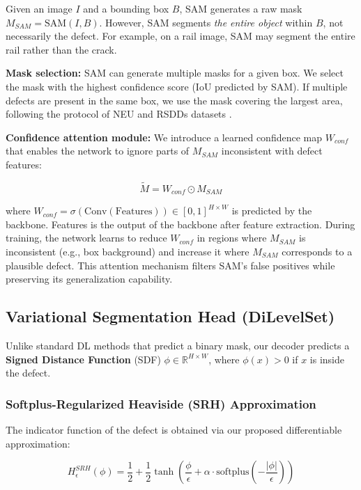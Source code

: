 \documentclass[12pt, a4paper]{article}
\newcommand{\R}{\mathbb{R}}
\begin{document}
Given an image $I$ and a bounding box $B$, SAM generates a raw mask $M_{SAM} = \text{SAM}(I, B)$. However, SAM segments \textit{the entire object} within $B$, not necessarily the defect. For example, on a rail image, SAM may segment the entire rail rather than the crack.

\textbf{Mask selection:} SAM can generate multiple masks for a given box. We select the mask with the highest confidence score (IoU predicted by SAM). If multiple defects are present in the same box, we use the mask covering the largest area, following the protocol of NEU and RSDDs datasets \cite{neu2024, rsdds2024}.

\textbf{Confidence attention module:} We introduce a learned confidence map $W_{conf}$ that enables the network to ignore parts of $M_{SAM}$ inconsistent with defect features:

\begin{equation}
\tilde{M} = W_{conf} \odot M_{SAM}
\label{eq:weighted_mask}
\end{equation}

where $W_{conf} = \sigma(\text{Conv}(\text{Features})) \in [0,1]^{H \times W}$ is predicted by the backbone. Features is the output of the backbone after feature extraction. During training, the network learns to reduce $W_{conf}$ in regions where $M_{SAM}$ is inconsistent (e.g., box background) and increase it where $M_{SAM}$ corresponds to a plausible defect. This attention mechanism filters SAM's false positives while preserving its generalization capability.

\subsection{Variational Segmentation Head (DiLevelSet)}
\label{subsec:difflevelset}

Unlike standard DL methods that predict a binary mask, our decoder predicts a \textbf{Signed Distance Function} (SDF) $\phi \in \R^{H \times W}$, where $\phi(x) > 0$ if $x$ is inside the defect.

\subsubsection{Softplus-Regularized Heaviside (SRH) Approximation}
\label{subsec:srh_approx}

The indicator function of the defect is obtained via our proposed differentiable approximation:

\begin{equation}
H_\epsilon^{SRH}(\phi) = \frac{1}{2} + \frac{1}{2}\tanh\left(\frac{\phi}{\epsilon} + \alpha \cdot \text{softplus}\left(-\frac{|\phi|}{\epsilon}\right)\right)
\label{eq:srh}
\end{equation}
\end{document}
